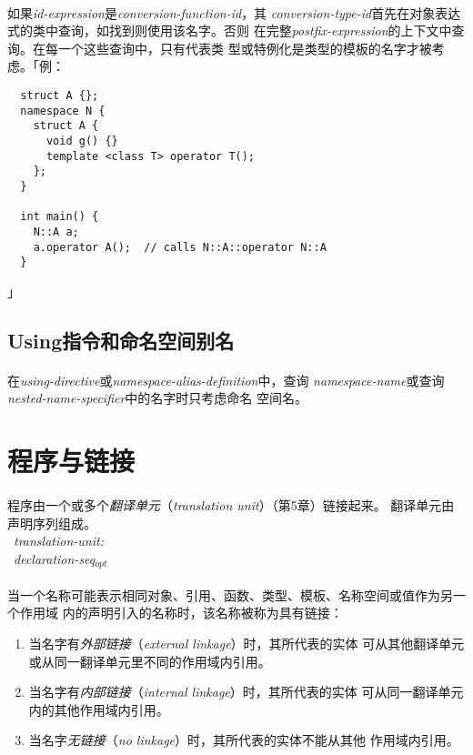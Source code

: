 \paragraph{}
如果\textit{id-expression}是\textit{conversion-function-id}，其
\textit{conversion-type-id}首先在对象表达式的类中查询，如找到则使用该名字。否则
在完整\textit{postfix-expression}的上下文中查询。在每一个这些查询中，只有代表类
型或特例化是类型的模板的名字才被考虑。「例：
\begin{lstlisting}
  struct A {};
  namespace N {
    struct A {
      void g() {}
      template <class T> operator T();
    };
  }

  int main() {
    N::A a;
    a.operator A();  // calls N::A::operator N::A
  }
\end{lstlisting}」

\subsection{Using指令和命名空间别名}
\paragraph{}
在\textit{using-directive}或\textit{namespace-alias-definition}中，查询
\textit{namespace-name}或查询\textit{nested-name-specifier}中的名字时只考虑命名
空间名。

\section{程序与链接}
\paragraph{}
程序由一个或多个\textit{翻译单元}（\textit{translation unit}）（第5章）链接起来。
翻译单元由声明序列组成。 \\
\mbox{ \qquad \qquad \textit{translation-unit:} }       \\
\mbox{ \qquad \qquad \qquad \textit{declaration-seq$_{opt}$}}

\paragraph{}
当一个名称可能表示相同对象、引用、函数、类型、模板、名称空间或值作为另一个作用域
内的声明引入的名称时，该名称被称为具有链接：
\begin{enumerate}
  \item{当名字有\textit{外部链接}（\textit{external linkage}）时，其所代表的实体
    可从其他翻译单元或从同一翻译单元里不同的作用域内引用。}
  \item{当名字有\textit{内部链接}（\textit{internal linkage}）时，其所代表的实体
    可从同一翻译单元内的其他作用域内引用。}
  \item{当名字\textit{无链接}（\textit{no linkage}）时，其所代表的实体不能从其他
    作用域内引用。}
\end{enumerate}


